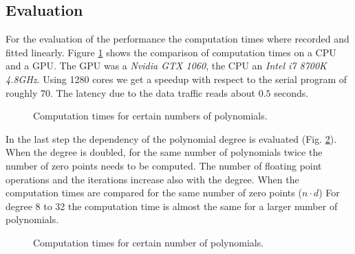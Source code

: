 \documentclass[a4paper,headsepline=3pt,headinclude=true,12pt,oneside]{scrartcl}
\begin{document}
\begin{onehalfspace}
	
	\section{Evaluation}
	For the evaluation of the performance the computation times where recorded and fitted linearly. Figure \ref{plot1} shows the comparison of computation times on a CPU and a GPU. The GPU was a \textit{Nvidia GTX 1060}, the CPU an \textit{Intel i7 8700K 4.8GHz}. Using 1280 cores we get a speedup with respect to the serial program of roughly $70$. The latency due to the data traffic reads about $0.5$ seconds.
	
	\begin{figure}[h]
		\centering
		
		\caption{Computation times for certain numbers of polynomials.}
		\label{plot1}
	\end{figure}
	
	\newpage
	
	In the last step the dependency of the polynomial degree is evaluated (Fig. \ref{plot2}). When the degree is doubled, for the same number of polynomials twice the number of zero points needs to be computed. The number of floating point operations and the iterations increase also with the degree. When the computation times are compared for the same number of zero points ($n\cdot d$) For degree 8 to 32 the computation time is almost the same for a larger number of polynomials.
	
	\begin{figure}[h]
		\centering
		
		\caption{Computation times for certain number of polynomials.}
		\label{plot2}
	\end{figure}
	

\end{onehalfspace}
\end{document}

